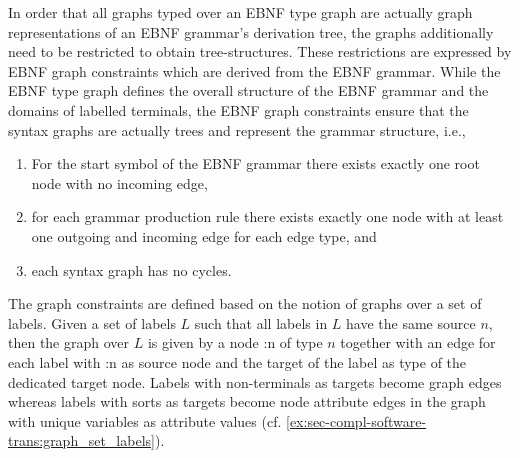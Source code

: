 In order that all graphs typed over an EBNF type graph are actually graph representations of an EBNF grammar's derivation tree, the graphs additionally need to be restricted to obtain tree-structures.
These restrictions are expressed by EBNF graph constraints which are derived from the EBNF grammar.
While the EBNF type graph defines the overall structure of the EBNF grammar and the domains of labelled terminals, the EBNF graph constraints ensure that the syntax graphs are actually trees and represent the grammar structure, i.e.,
\begin{enumerate}
  \item For the start symbol of the EBNF grammar there exists exactly one root node with no incoming edge,
  \item for each grammar production rule there exists exactly one node with at least one outgoing and incoming edge for each edge type, and
  \item each syntax graph has no cycles.
\end{enumerate}
The graph constraints are defined based on the notion of graphs over a set of labels.
Given a set of labels $L$ such that all labels in $L$ have the same source $n$, then the graph over $L$ is given by a node \textsf{:n} of type $n$ together with an edge for each label with \textsf{:n} as source node and the target of the label as type of the dedicated target node.
Labels with non-terminals as targets become graph edges whereas labels with sorts as targets become node attribute edges in the graph with unique variables as attribute values (cf. \cref{ex:sec-compl-software-trans:graph_set_labels}).


